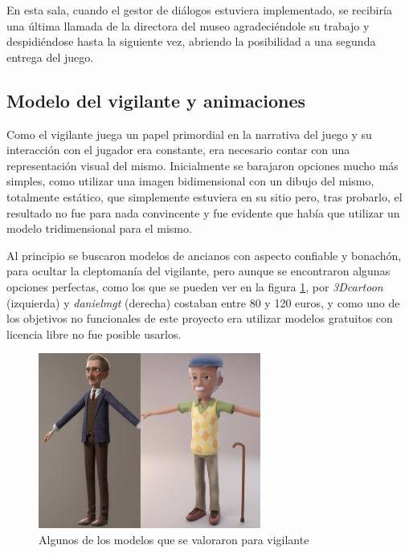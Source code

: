 En esta sala, cuando el gestor de diálogos estuviera implementado, se recibiría una última llamada de la directora del museo agradeciéndole su trabajo y despidiéndose hasta la siguiente vez, abriendo la posibilidad a una segunda entrega del juego. 

\subsection{Modelo del vigilante y animaciones}

Como el vigilante juega un papel primordial en la narrativa del juego y su interacción con el jugador era constante, era necesario contar con una representación visual del mismo. Inicialmente se barajaron opciones mucho más simples, como utilizar una imagen bidimensional con un dibujo del mismo, totalmente estático, que simplemente estuviera en su sitio pero, tras probarlo, el resultado no fue para nada convincente y fue evidente que había que utilizar un modelo tridimensional para el mismo. 

Al principio se buscaron modelos de ancianos con aspecto confiable y bonachón, para ocultar la cleptomanía del vigilante, pero aunque se encontraron algunas opciones perfectas, como los que se pueden ver en la figura \ref{fig:modelos-alt}, por \textit{3Dcartoon} (izquierda) y \textit{danielmgt} (derecha) costaban entre 80 y 120 euros, y como uno de los objetivos no funcionales de este proyecto era utilizar modelos gratuitos con licencia libre no fue posible usarlos.

\begin{figure}[!h]
\begin{center}
\includegraphics[width=0.65\textwidth]{imagenes/7/modelos-alt.png}
\caption{Algunos de los modelos que se valoraron para vigilante}
\label{fig:modelos-alt}
\end{center}
\vspace{-0.25cm}
\end{figure}

